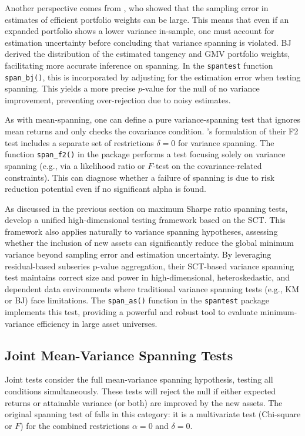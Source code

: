 Another perspective comes from \citet{BrittenJones1999}, who showed that the
sampling error in estimates of efficient portfolio weights can be large.
This means that even if an expanded portfolio shows a lower variance
in-sample, one must account for estimation uncertainty before concluding
that variance spanning is violated. BJ derived the distribution of the
estimated tangency and GMV portfolio weights, facilitating more accurate
inference on spanning. In the \texttt{spantest} function \texttt{span\_bj()}, this is
incorporated by adjusting for the estimation error when testing
spanning. This yields a more precise \(p\)-value for the null of no
variance improvement, preventing over-rejection due to noisy estimates.

As with mean-spanning, one can define a pure variance-spanning test that
ignores mean returns and only checks the covariance condition.
\citet{KanZhou2012}'s formulation of their F2 test includes a separate set of
restrictions \(\delta = 0\) for variance spanning. The function
\texttt{span\_f2()} in the package performs a test focusing solely on variance
spanning (e.g., via a likelihood ratio or \(F\)-test on the
covariance-related constraints). This can diagnose whether a failure of
spanning is due to risk reduction potential even if no significant alpha
is found.

As discussed in the previous section on maximum Sharpe ratio spanning
tests, \citet{ArdiaSessinou2025} develop a unified high-dimensional testing
framework based on the SCT. This framework also applies naturally to
variance spanning hypotheses, assessing whether the inclusion of new
assets can significantly reduce the global minimum variance beyond
sampling error and estimation uncertainty. By leveraging residual-based
subseries p-value aggregation, their SCT-based variance spanning test
maintains correct size and power in high-dimensional, heteroskedastic,
and dependent data environments where traditional variance spanning
tests (e.g., KM or BJ) face limitations. The \texttt{span\_as()} function in the
\texttt{spantest} package implements this test, providing a powerful and robust
tool to evaluate minimum-variance efficiency in large asset universes.

\subsection{Joint Mean-Variance Spanning Tests}\label{joint-mean-variance-spanning-tests}

Joint tests consider the full mean-variance spanning hypothesis, testing
all conditions simultaneously. These tests will reject the null if
either expected returns or attainable variance (or both) are improved by
the new assets. The original spanning test of \citet{HubermanKandel1987} falls
in this category: it is a multivariate test (Chi-square or \(F\)) for the
combined restrictions \(\alpha = 0\) and \(\delta = 0\).

